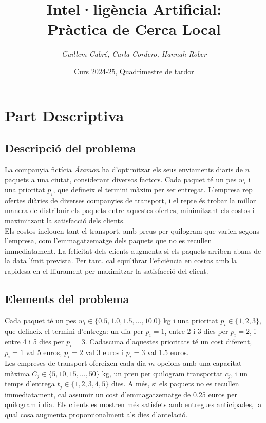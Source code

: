 \documentclass[a4paper]{article}
\title{\textbf{Intel·ligència Artificial:\\
		Pràctica de Cerca Local}}
\author{\emph{Guillem Cabré, Carla Cordero, Hannah Röber}}
\date{Curs 2024-25, Quadrimestre de tardor}
\begin{document}
	
	\begin{titlepage}
		\clearpage\maketitle
		\thispagestyle{empty}
	\end{titlepage}
	
	\tableofcontents
	\clearpage
	
	\section{Part Descriptiva}
	
	\subsection{Descripció del problema}
	
	La companyia fictícia \textit{Ázamon} ha d'optimitzar els seus enviaments diaris de $n$ paquets a una ciutat, considerant diversos factors. Cada paquet té un pes $w_i$ i una prioritat $p_i$, que defineix el termini màxim per ser entregat. L'empresa rep ofertes diàries de diverses companyies de transport, i el repte és trobar la millor manera de distribuir els paquets entre aquestes ofertes, minimitzant els costos i maximitzant la satisfacció dels clients. \\
	
	Els costos inclouen tant el transport, amb preus per quilogram que varien segons l'empresa, com l'emmagatzematge dels paquets que no es recullen immediatament. La felicitat dels clients augmenta si els paquets arriben abans de la data límit prevista. Per tant, cal equilibrar l'eficiència en costos amb la rapidesa en el lliurament per maximitzar la satisfacció del client. \\
	
	\subsection{Elements del problema}
	
	Cada paquet té un pes $w_i \in \{0.5, 1.0, 1.5, ..., 10.0\}$ kg i una prioritat $p_i \in \{1, 2, 3\}$, que defineix el termini d'entrega: un dia per $p_i = 1$, entre 2 i 3 dies per $p_i = 2$, i entre 4 i 5 dies per $p_i = 3$. Cadascuna d'aquestes prioritats té un cost diferent, $p_i = 1$ val 5 euros, $p_i = 2$ val 3 euros i $p_i = 3$ val 1.5 euros. \\
	
	Les empreses de transport ofereixen cada dia $m$ opcions amb una capacitat màxima $C_j \in \{5, 10, 15, ..., 50\}$ kg, un preu per quilogram transportat $c_j$, i un temps d'entrega $t_j \in \{1, 2, 3, 4, 5\}$ dies. A més, si els paquets no es recullen immediatament, cal assumir un cost d'emmagatzematge de 0.25 euros per quilogram i dia. Els clients es mostren més satisfets amb entregues anticipades, la qual cosa augmenta proporcionalment als dies d'antelació. \\
	
\end{document}
